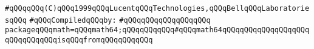 \label{src/lib/std/src/bind-math-32.pkg}
\verb|#qQQqqQQq(C)qQQq1999qQQqLucentqQQqTechnologies,qQQqBellqQQqLaboratoriesqQQq|\newline
\newline
\verb|#qQQqCompiledqQQqby:|\newline
\verb|#qQQqqQQqqQQqqQQqqQQq|\newline
\newline
\verb|packageqQQqmath=qQQqmath64;qQQqqQQqqQQq#qQQqmath64qQQqqQQqqQQqqQQqqQQqqQQqqQQqqQQqisqQQqfromqQQqqQQqqQQq|\newline
\newline

